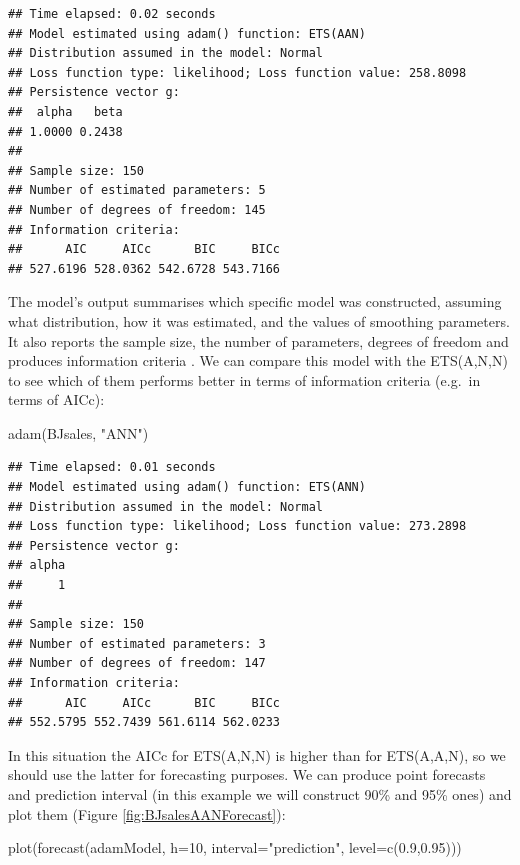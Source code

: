\documentclass[
]{book}
\newenvironment{Shaded}{\begin{snugshade}}{\end{snugshade}}
\newcommand{\AttributeTok}[1]{\textcolor[rgb]{0.77,0.63,0.00}{#1}}
\newcommand{\DecValTok}[1]{\textcolor[rgb]{0.00,0.00,0.81}{#1}}
\newcommand{\FloatTok}[1]{\textcolor[rgb]{0.00,0.00,0.81}{#1}}
\newcommand{\FunctionTok}[1]{\textcolor[rgb]{0.00,0.00,0.00}{#1}}
\newcommand{\NormalTok}[1]{#1}
\newcommand{\StringTok}[1]{\textcolor[rgb]{0.31,0.60,0.02}{#1}}
\theoremstyle{definition}
\theoremstyle{definition}
\theoremstyle{definition}
\theoremstyle{definition}
\theoremstyle{remark}
\begin{document}
\begin{verbatim}
## Time elapsed: 0.02 seconds
## Model estimated using adam() function: ETS(AAN)
## Distribution assumed in the model: Normal
## Loss function type: likelihood; Loss function value: 258.8098
## Persistence vector g:
##  alpha   beta 
## 1.0000 0.2438 
## 
## Sample size: 150
## Number of estimated parameters: 5
## Number of degrees of freedom: 145
## Information criteria:
##      AIC     AICc      BIC     BICc 
## 527.6196 528.0362 542.6728 543.7166
\end{verbatim}

The model's output summarises which specific model was constructed, assuming what distribution, how it was estimated, and the values of smoothing parameters. It also reports the sample size, the number of parameters, degrees of freedom and produces information criteria \citep[see Section 13.4 of][]{SvetunkovSBA}. We can compare this model with the ETS(A,N,N) to see which of them performs better in terms of information criteria (e.g.~in terms of AICc):

\begin{Shaded}
\begin{Highlighting}[]
\FunctionTok{adam}\NormalTok{(BJsales, }\StringTok{"ANN"}\NormalTok{)}
\end{Highlighting}
\end{Shaded}

\begin{verbatim}
## Time elapsed: 0.01 seconds
## Model estimated using adam() function: ETS(ANN)
## Distribution assumed in the model: Normal
## Loss function type: likelihood; Loss function value: 273.2898
## Persistence vector g:
## alpha 
##     1 
## 
## Sample size: 150
## Number of estimated parameters: 3
## Number of degrees of freedom: 147
## Information criteria:
##      AIC     AICc      BIC     BICc 
## 552.5795 552.7439 561.6114 562.0233
\end{verbatim}

In this situation the AICc for ETS(A,N,N) is higher than for ETS(A,A,N), so we should use the latter for forecasting purposes. We can produce point forecasts and prediction interval (in this example we will construct 90\% and 95\% ones) and plot them (Figure \ref{fig:BJsalesAANForecast}):

\begin{Shaded}
\begin{Highlighting}[]
\FunctionTok{plot}\NormalTok{(}\FunctionTok{forecast}\NormalTok{(adamModel, }\AttributeTok{h=}\DecValTok{10}\NormalTok{,}
              \AttributeTok{interval=}\StringTok{"prediction"}\NormalTok{, }\AttributeTok{level=}\FunctionTok{c}\NormalTok{(}\FloatTok{0.9}\NormalTok{,}\FloatTok{0.95}\NormalTok{)))}
\end{Highlighting}
\end{Shaded}
\end{document}

